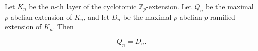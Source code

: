 Let $K_n$ be the $n$-th layer of the cyclotomic $\mathbb{Z}_p$-extension. Let $Q_n$ be the maximal $p$-abelian extension of $K_n$, and let $D_n$ be the maximal $p$-abelian $p$-ramified extension of $K_n$. Then

$$Q_n = D_n.$$
